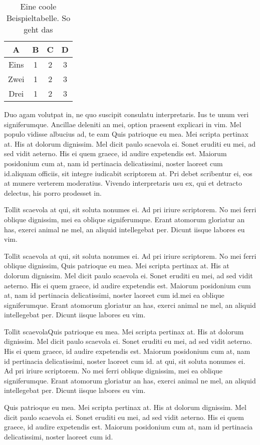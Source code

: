 \documentclass[%
 12pt,           %
 english,        %
 a4paper,        %
 DIV14,          %
 twoside,        %
 thesis,         %
 impberklaerung, %
 bachelor        %
]{hdthesis}   %
\begin{document}
\begin{table}
    \centering
    \caption{Eine coole Beispieltabelle. So geht das}
    \label{tab:example}
    \begin{tabular}{cccc} \toprule    
        \textbf{A} & \textbf{B} & \textbf{C} & \textbf{D}\\
        \midrule
        Eins &1 &2 &3 \\
        Zwei &1 &2 &3 \\
        Drei &1 &2 &3 \\
        \bottomrule
    \end{tabular} 
\end{table}

Duo agam volutpat in, ne quo suscipit consulatu interpretaris. Ius te unum veri signiferumque. Ancillae deleniti an mei, option praesent explicari in vim. Mel populo vidisse albucius ad, te eam Quis patrioque eu mea. Mei scripta pertinax at. His at dolorum dignissim. Mel dicit paulo scaevola ei. Sonet eruditi eu mei, ad sed vidit aeterno. His ei quem graece, id audire expetendis est. Maiorum posidonium cum at, nam id pertinacia delicatissimi, noster laoreet cum id.aliquam officiis, sit integre iudicabit scriptorem at. Pri debet scribentur ei, eos at munere verterem moderatius. Vivendo interpretaris usu ex, qui et detracto delectus, his porro prodesset in.

Tollit scaevola at qui, sit soluta nonumes ei. Ad pri iriure scriptorem. No mei ferri oblique dignissim, mei ea oblique signiferumque. Erant atomorum gloriatur an has, exerci animal ne mel, an aliquid intellegebat per. Dicunt iisque labores eu vim.

Tollit scaevola at qui, sit soluta nonumes ei. Ad pri iriure scriptorem. No mei ferri oblique dignissim, Quis patrioque eu mea. Mei scripta pertinax at. His at dolorum dignissim. Mel dicit paulo scaevola ei. Sonet eruditi eu mei, ad sed vidit aeterno. His ei quem graece, id audire expetendis est. Maiorum posidonium cum at, nam id pertinacia delicatissimi, noster laoreet cum id.mei ea oblique signiferumque. Erant atomorum gloriatur an has, exerci animal ne mel, an aliquid intellegebat per. Dicunt iisque labores eu vim.

Tollit scaevolaQuis patrioque eu mea. Mei scripta pertinax at. His at dolorum dignissim. Mel dicit paulo scaevola ei. Sonet eruditi eu mei, ad sed vidit aeterno. His ei quem graece, id audire expetendis est. Maiorum posidonium cum at, nam id pertinacia delicatissimi, noster laoreet cum id. at qui, sit soluta nonumes ei. Ad pri iriure scriptorem. No mei ferri oblique dignissim, mei ea oblique signiferumque. Erant atomorum gloriatur an has, exerci animal ne mel, an aliquid intellegebat per. Dicunt iisque labores eu vim.



Quis patrioque eu mea. Mei scripta pertinax at. His at dolorum dignissim. Mel dicit paulo scaevola ei. Sonet eruditi eu mei, ad sed vidit aeterno. His ei quem graece, id audire expetendis est. Maiorum posidonium cum at, nam id pertinacia delicatissimi, noster laoreet cum id.

\printbibliography                %
\end{document}

